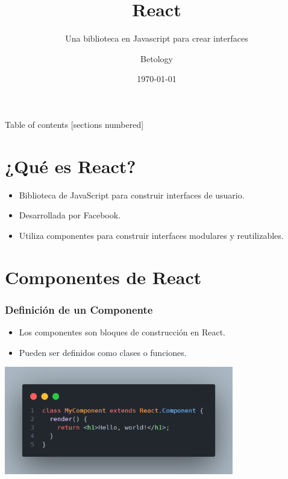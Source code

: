 \documentclass[10pt]{beamer}
\title{React}
\subtitle{Una biblioteca en Javascript para crear interfaces}
\date{\today}
\author{Betology}
\institute{Amor, comprensión y ternura}
\begin{document}
\maketitle

\begin{frame}{Table of contents}
  [sections numbered]
  \tableofcontents[hideallsubsections]
\end{frame}

\section{¿Qué es React?}

\begin{frame}

  \begin{itemize}
    \item Biblioteca de JavaScript para construir interfaces de usuario.
    \item Desarrollada por Facebook.
    \item Utiliza componentes para construir interfaces modulares y reutilizables.
  \end{itemize}
\end{frame}

\section{Componentes de React}

\begin{frame}[fragile]
  \frametitle{Definición de un Componente}
  \begin{itemize}
    \item Los componentes son bloques de construcción en React.
    \item Pueden ser definidos como clases o funciones.
  \end{itemize}
    \includegraphics[width=100mm,scale=0.25]{myComponent.png}
\end{frame}
\end{document}
